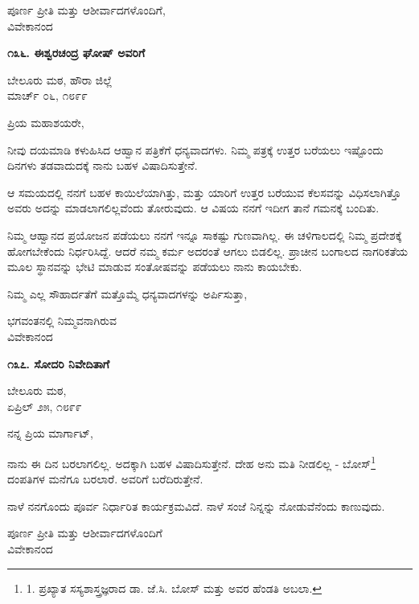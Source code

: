 \begin{flushright}
ಪೂರ್ಣ ಪ್ರೀತಿ ಮತ್ತು ಆಶೀರ್ವಾದಗಳೊಂದಿಗೆ,\\ವಿವೇಕಾನಂದ
\end{flushright}

\begin{center}
\textbf{೧೩೬. ಈಶ್ವರಚಂದ್ರ ಘೋಷ್ ಅವರಿಗೆ}
\end{center}

\begin{flushright}
ಬೇಲೂರು ಮಠ, ಹೌರಾ ಜಿಲ್ಲೆ\\ಮಾರ್ಚ್ ೦೬, ೧೮೯೯
\end{flushright}

ಪ್ರಿಯ ಮಹಾಶಯರೇ,

ನೀವು ದಯಮಾಡಿ ಕಳುಹಿಸಿದ ಆಹ್ವಾನ ಪತ್ರಿಕೆಗೆ ಧನ್ಯವಾದಗಳು. ನಿಮ್ಮ ಪತ್ರಕ್ಕೆ ಉತ್ತರ ಬರೆಯಲು ಇಷ್ಟೊಂದು ದಿನಗಳು ತಡವಾದುದಕ್ಕೆ ನಾನು ಬಹಳ ವಿಷಾದಿಸುತ್ತೇನೆ.

ಆ ಸಮಯದಲ್ಲಿ ನನಗೆ ಬಹಳ ಕಾಯಿಲೆಯಾಗಿತ್ತು, ಮತ್ತು ಯಾರಿಗೆ ಉತ್ತರ ಬರೆಯುವ ಕೆಲಸವನ್ನು ವಿಧಿಸಲಾಗಿತ್ತೊ ಅವರು ಅದನ್ನು ಮಾಡಲಾಗಲಿಲ್ಲವೆಂದು ತೋರುವುದು. ಆ ವಿಷಯ ನನಗೆ ಇದೀಗ ತಾನೆ ಗಮನಕ್ಕೆ ಬಂದಿತು.

ನಿಮ್ಮ ಆಹ್ವಾನದ ಪ್ರಯೋಜನ ಪಡೆಯಲು ನನಗೆ ಇನ್ನೂ ಸಾಕಷ್ಟು ಗುಣವಾಗಿಲ್ಲ. ಈ ಚಳಿಗಾಲದಲ್ಲಿ ನಿಮ್ಮ ಪ್ರದೇಶಕ್ಕೆ ಹೋಗಬೇಕೆಂದು ನಿರ್ಧರಿಸಿದ್ದೆ. ಆದರೆ ನಮ್ಮ ಕರ್ಮ ಅದರಂತೆ ಆಗಲು ಬಿಡಲಿಲ್ಲ. ಪ್ರಾಚೀನ ಬಂಗಾಲದ ನಾಗರಿಕತೆಯ ಮೂಲ ಸ್ಥಾನವನ್ನು ಭೇಟಿ ಮಾಡುವ ಸಂತೋಷವನ್ನು ಪಡೆಯಲು ನಾನು ಕಾಯಬೇಕು.

ನಿಮ್ಮ ಎಲ್ಲ ಸೌಹಾರ್ದತೆಗೆ ಮತ್ತೊಮ್ಮೆ ಧನ್ಯವಾದಗಳನ್ನು ಅರ್ಪಿಸುತ್ತಾ,

\begin{flushright}
ಭಗವಂತನಲ್ಲಿ ನಿಮ್ಮವನಾಗಿರುವ\\ವಿವೇಕಾನಂದ
\end{flushright}

\begin{center}
\textbf{೧೩೭. ಸೋದರಿ ನಿವೇದಿತಾಗೆ}
\end{center}

\begin{flushright}
ಬೇಲೂರು ಮಠ,\\ಏಪ್ರಿಲ್ ೨೫, ೧೮೯೯
\end{flushright}

ನನ್ನ ಪ್ರಿಯ ಮಾರ್ಗಾಟ್,

ನಾನು ಈ ದಿನ ಬರಲಾಗಲಿಲ್ಲ. ಅದಕ್ಕಾಗಿ ಬಹಳ ವಿಷಾದಿಸುತ್ತೇನೆ. ದೇಹ ಅನು ಮತಿ ನೀಡಲಿಲ್ಲ - ಬೋಸ್\footnote{1. ಪ್ರಖ್ಯಾತ ಸಸ್ಯಶಾಸ್ತ್ರಜ್ಞರಾದ ಡಾ. ಜೆ.ಸಿ. ಬೋಸ್ ಮತ್ತು ಅವರ ಹೆಂಡತಿ ಅಬಲಾ.} ದಂಪತಿಗಳ ಮನೆಗೂ ಬರಲಾರೆ. ಅವರಿಗೆ ಬರೆದಿರುತ್ತೇನೆ.

ನಾಳೆ ನನಗೊಂದು ಪೂರ್ವ ನಿರ್ಧಾರಿತ ಕಾರ್ಯಕ್ರಮವಿದೆ. ನಾಳೆ ಸಂಜೆ ನಿನ್ನನ್ನು ನೋಡುವೆನೆಂದು ಕಾಣುವುದು.

\begin{flushright}
ಪೂರ್ಣ ಪ್ರೀತಿ ಮತ್ತು ಆಶೀರ್ವಾದಗಳೊಂದಿಗೆ\\ವಿವೇಕಾನಂದ
\end{flushright}

